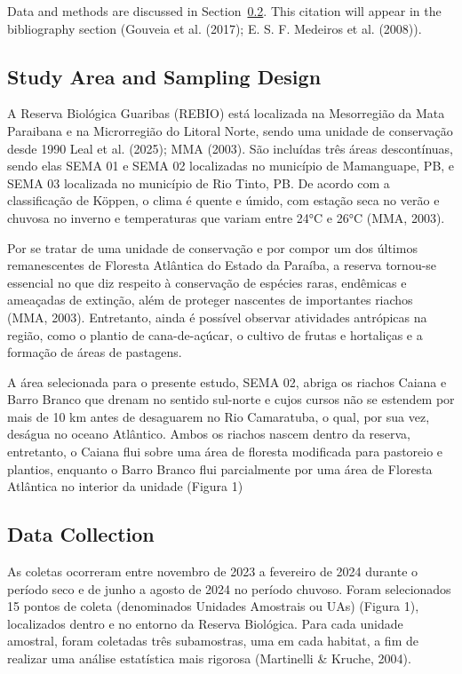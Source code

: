 \documentclass[
  letterpaper,
  DIV=11,
  numbers=noendperiod]{scrartcl}
\begin{document}
Data and methods are discussed in Section~\ref{sec-data-col}. This
citation will appear in the bibliography section (Gouveia et al. (2017);
E. S. F. Medeiros et al. (2008)).

\subsection{Study Area and Sampling
Design}\label{study-area-and-sampling-design}

A Reserva Biológica Guaribas (REBIO) está localizada na Mesorregião da
Mata Paraibana e na Microrregião do Litoral Norte, sendo uma unidade de
conservação desde 1990 Leal et al. (2025); MMA (2003). São incluídas
três áreas descontínuas, sendo elas SEMA 01 e SEMA 02 localizadas no
município de Mamanguape, PB, e SEMA 03 localizada no município de Rio
Tinto, PB. De acordo com a classificação de Köppen, o clima é quente e
úmido, com estação seca no verão e chuvosa no inverno e temperaturas que
variam entre 24°C e 26°C (MMA, 2003).

Por se tratar de uma unidade de conservação e por compor um dos últimos
remanescentes de Floresta Atlântica do Estado da Paraíba, a reserva
tornou-se essencial no que diz respeito à conservação de espécies raras,
endêmicas e ameaçadas de extinção, além de proteger nascentes de
importantes riachos (MMA, 2003). Entretanto, ainda é possível observar
atividades antrópicas na região, como o plantio de cana-de-açúcar, o
cultivo de frutas e hortaliças e a formação de áreas de pastagens.

A área selecionada para o presente estudo, SEMA 02, abriga os riachos
Caiana e Barro Branco que drenam no sentido sul-norte e cujos cursos não
se estendem por mais de 10 km antes de desaguarem no Rio Camaratuba, o
qual, por sua vez, deságua no oceano Atlântico. Ambos os riachos nascem
dentro da reserva, entretanto, o Caiana flui sobre uma área de floresta
modificada para pastoreio e plantios, enquanto o Barro Branco flui
parcialmente por uma área de Floresta Atlântica no interior da unidade
(Figura 1)

\subsection{Data Collection}\label{sec-data-col}

As coletas ocorreram entre novembro de 2023 a fevereiro de 2024 durante
o período seco e de junho a agosto de 2024 no período chuvoso. Foram
selecionados 15 pontos de coleta (denominados Unidades Amostrais ou UAs)
(Figura 1), localizados dentro e no entorno da Reserva Biológica. Para
cada unidade amostral, foram coletadas três subamostras, uma em cada
habitat, a fim de realizar uma análise estatística mais rigorosa
(Martinelli \& Kruche, 2004).
\end{document}
